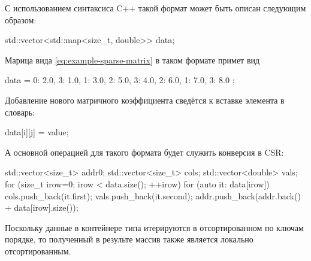 С использованием синтаксиса C++ такой формат может быть описан следующим образом:
\begin{cppcode}
std::vector<std::map<size_t, double>> data;
\end{cppcode}

Марица вида \eqref{eq:example-sparse-matrix} в таком формате примет вид
\begin{cppcode}
data = {
	{0: 2.0, 3: 1.0},
	{1: 3.0, 2: 5.0, 3: 4.0},
	{2: 6.0},
	{1: 7.0, 3: 8.0}
};
\end{cppcode}

Добавление нового матричного коэффициента сведётся к вставке элемента в словарь:
\begin{cppcode}
data[i][j] = value;
\end{cppcode}

А основной операцией для такого формата будет служить
конверсия в CSR:
\begin{cppcode}
std::vector<size_t> addr{0};
std::vector<size_t> cols;
std::vector<double> vals;
for (size_t irow=0; irow < data.size(); ++irow){
	for (auto it: data[irow]){
		cols.push_back(it.first);
		vals.push_back(it.second);
	}
	addr.push_back(addr.back() + data[irow].size());
}
\end{cppcode}
Поскольку данные в контейнере типа  итерируются
в отсортированном по ключам порядке, то полученный
в результе массив  также является локально отсортированным.
